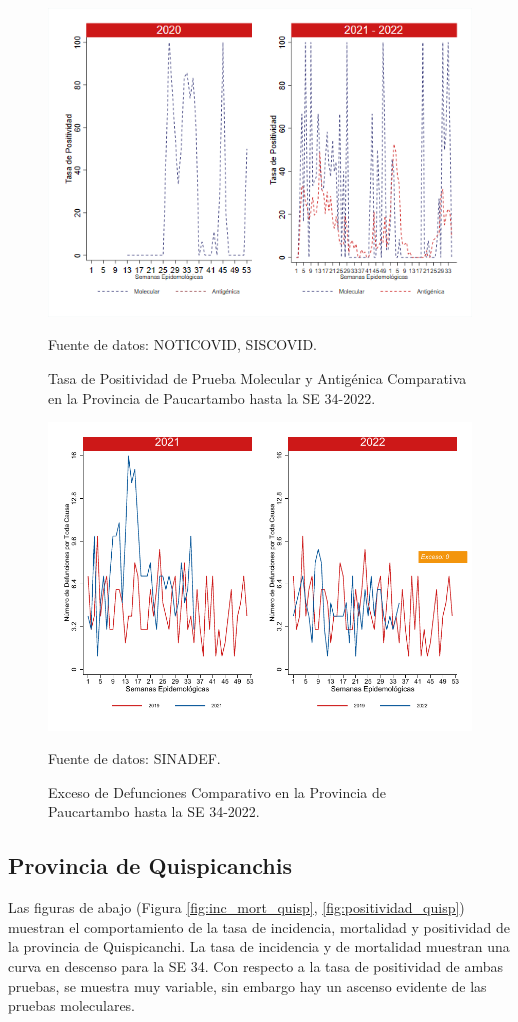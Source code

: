 \documentclass[12pt,a4paper,openany]{book}
\begin{document}
	\begin{figure}[h]
		\caption{Tasa de Positividad de Prueba Molecular y Antigénica Comparativa en la Provincia de Paucartambo hasta la SE 34-2022.}\label{fig:positividad_paucartam}
		\begin{center}
			\includegraphics[width=0.7\linewidth]{../figuras/positividad_20_21_11.png}
		\end{center}
		{\footnotesize {Fuente de datos: NOTICOVID, SISCOVID.}}
	\end{figure}
	
	\begin{figure}[h]
		\caption{Exceso de Defunciones Comparativo en la Provincia de Paucartambo hasta la SE 34-2022.}\label{fig:exceso_paucartam}
		\begin{center}
			\includegraphics[width=0.7\linewidth]{../figuras/exceso_11.pdf}
		\end{center}
		{\footnotesize {Fuente de datos: SINADEF.}}
	\end{figure}
	
	\clearpage
	
	\subsection*{Provincia de Quispicanchis}
	\noindent Las figuras de abajo (Figura \ref{fig:inc_mort_quisp}, \ref{fig:positividad_quisp}) muestran el comportamiento de la tasa de incidencia, mortalidad y positividad de la provincia de Quispicanchi. La tasa de incidencia y de mortalidad muestran una curva en descenso para la SE 34. Con respecto a la tasa de positividad de ambas pruebas, se muestra muy variable, sin embargo hay un ascenso evidente de las pruebas moleculares.
	
\end{document}
